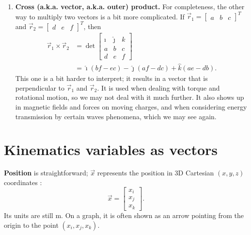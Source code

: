 \documentclass{tufte-handout}
\begin{document}
\begin{enumerate}
\item \textbf{Cross (a.k.a. vector, a.k.a. outer) product.} For completeness, the other way to multiply two vectors is a bit more complicated. If $\vec{r}_1 = \begin{bmatrix}a&b& c\end{bmatrix}^T$ and $\vec{r}_2 = \begin{bmatrix}d&e&f\end{bmatrix}^T$, then
\begin{align}
\vec{r}_1 \times \vec{r}_2 &= 
\det\begin{bmatrix} 
\hat{\imath} & \hat{\jmath} & \hat{k} \\
a & b & c \\
d & e & f 
\end{bmatrix} \\
&= \hat{\imath}(bf - ec) - \hat{\jmath} (af-dc) + \hat{k} (ae-db).
\end{align}
This one is a bit harder to interpret; it results in a vector that is perpendicular to $\vec{r}_1$ and $\vec{r}_2$. It is used when dealing with torque and rotational motion, so we may not deal with it much further. It also shows up in magnetic fields and forces on moving charges, and when considering energy transmission by certain waves phenomena, which we may see again. 
\end{enumerate}

\section{Kinematics variables as vectors}
\textbf{Position} is straightforward; $\vec{x}$ represents the position in 3D Cartesian $(x,y,z)$ coordinates :
\begin{equation}
\vec{x} = \begin{bmatrix} x_i \\ x_j \\ x_k \end{bmatrix}.
\end{equation}
Its units are still \si{\meter}. On a graph, it is often shown as an arrow pointing from the origin to the point $(x_i, x_j, x_k)$. 
\end{document}

